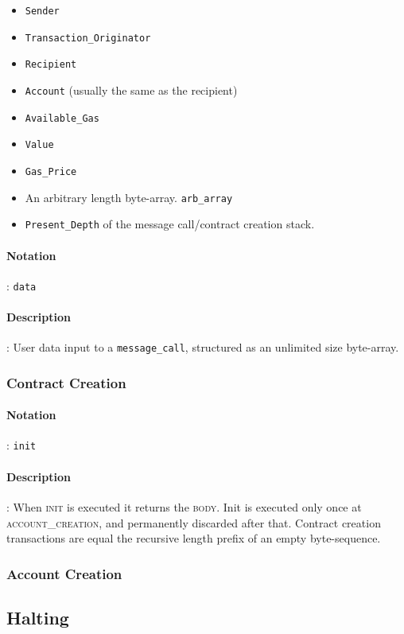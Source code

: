 \documentclass[10pt,a4paper,leqno,bibliography=totoc]{scrartcl}
\newenvironment{alphafootnotes}
{\par\edef\savedfootnotenumber{\number\value{footnote}}
\renewcommand{\thefootnote}{\alph{footnote}}
\setcounter{footnote}{0}}
{\par\setcounter{footnote}{\savedfootnotenumber}}
\begin{document}
\begin{alphafootnotes}
\begin{multicols*}{2}
\begin{itemize}
	\item \texttt{Sender}
	\item \texttt{Transaction\_Originator} 
	\item \texttt{Recipient}
	\item \texttt{Account} (usually the same as the recipient) 
	\item \texttt{Available\_Gas} 
	\item \texttt{Value}
	\item \texttt{Gas\_Price}
	\item An arbitrary length byte-array. \texttt{arb\_array}
	\item \texttt{Present\_Depth} of the message call/contract creation stack.
\end{itemize}
\paragraph{Notation}: \texttt{data}
\paragraph{Description}: User data input to a \texttt{message\_call}, structured as an unlimited size byte-array.

			\subsubsection{Contract Creation}
				\paragraph{Notation}: \texttt{init}
				\paragraph{Description}: When \textsc{init} is executed it returns the \textsc{body}. Init is executed only once at \textsc{account\_creation}, and permanently discarded after that. 				Contract creation transactions are equal the recursive length prefix of an empty byte-sequence. 		
			\subsubsection{Account Creation}
			
			\subsection{Halting}

\end{multicols*}
\end{alphafootnotes}
\end{document}
